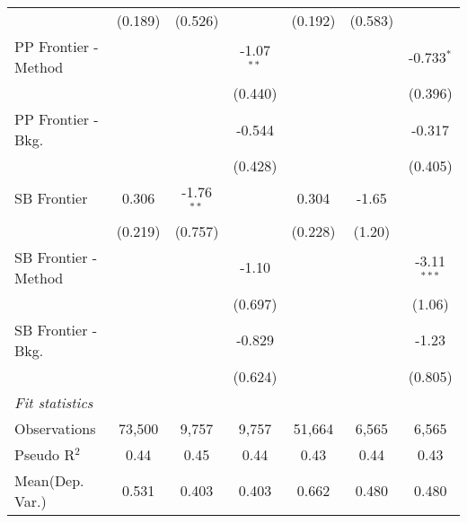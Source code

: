 \begin{tabular}{lcccccc}
                        & (0.189)       & (0.526)      &              & (0.192)       & (0.583) &   \\   
   PP Frontier - Method &               &              & -1.07$^{**}$ &               &         & -0.733$^{*}$\\   
                        &               &              & (0.440)      &               &         & (0.396)\\   
   PP Frontier - Bkg.   &               &              & -0.544       &               &         & -0.317\\   
                        &               &              & (0.428)      &               &         & (0.405)\\   
   SB Frontier          & 0.306         & -1.76$^{**}$ &              & 0.304         & -1.65   &   \\   
                        & (0.219)       & (0.757)      &              & (0.228)       & (1.20)  &   \\   
   SB Frontier - Method &               &              & -1.10        &               &         & -3.11$^{***}$\\   
                        &               &              & (0.697)      &               &         & (1.06)\\   
   SB Frontier - Bkg.   &               &              & -0.829       &               &         & -1.23\\   
                        &               &              & (0.624)      &               &         & (0.805)\\   
   \midrule
   \emph{Fit statistics}\\
   Observations         & 73,500        & 9,757        & 9,757        & 51,664        & 6,565   & 6,565\\  
   Pseudo R$^2$         & 0.44          & 0.45         & 0.44         & 0.43          & 0.44    & 0.43\\  
Mean(Dep. Var.) & 0.531 & 0.403 & 0.403 & 0.662 & 0.480 & 0.480 \\
   

\end{tabular}
